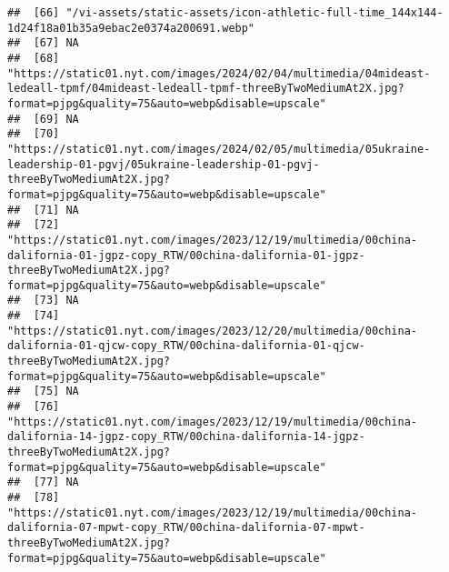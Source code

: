 \documentclass[
]{article}
\begin{document}
\begin{verbatim}
##  [66] "/vi-assets/static-assets/icon-athletic-full-time_144x144-1d24f18a01b35a9ebac2e0374a200691.webp"                                                                                                      
##  [67] NA                                                                                                                                                                                                    
##  [68] "https://static01.nyt.com/images/2024/02/04/multimedia/04mideast-ledeall-tpmf/04mideast-ledeall-tpmf-threeByTwoMediumAt2X.jpg?format=pjpg&quality=75&auto=webp&disable=upscale"                       
##  [69] NA                                                                                                                                                                                                    
##  [70] "https://static01.nyt.com/images/2024/02/05/multimedia/05ukraine-leadership-01-pgvj/05ukraine-leadership-01-pgvj-threeByTwoMediumAt2X.jpg?format=pjpg&quality=75&auto=webp&disable=upscale"           
##  [71] NA                                                                                                                                                                                                    
##  [72] "https://static01.nyt.com/images/2023/12/19/multimedia/00china-dalifornia-01-jgpz-copy_RTW/00china-dalifornia-01-jgpz-threeByTwoMediumAt2X.jpg?format=pjpg&quality=75&auto=webp&disable=upscale"      
##  [73] NA                                                                                                                                                                                                    
##  [74] "https://static01.nyt.com/images/2023/12/20/multimedia/00china-dalifornia-01-qjcw-copy_RTW/00china-dalifornia-01-qjcw-threeByTwoMediumAt2X.jpg?format=pjpg&quality=75&auto=webp&disable=upscale"      
##  [75] NA                                                                                                                                                                                                    
##  [76] "https://static01.nyt.com/images/2023/12/19/multimedia/00china-dalifornia-14-jgpz-copy_RTW/00china-dalifornia-14-jgpz-threeByTwoMediumAt2X.jpg?format=pjpg&quality=75&auto=webp&disable=upscale"      
##  [77] NA                                                                                                                                                                                                    
##  [78] "https://static01.nyt.com/images/2023/12/19/multimedia/00china-dalifornia-07-mpwt-copy_RTW/00china-dalifornia-07-mpwt-threeByTwoMediumAt2X.jpg?format=pjpg&quality=75&auto=webp&disable=upscale"      

\end{verbatim}
\end{document}
